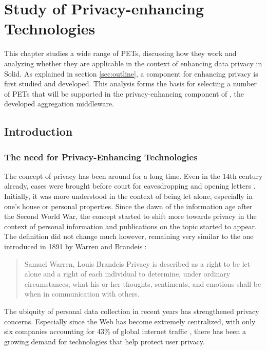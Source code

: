 \chapter{Study of Privacy-enhancing Technologies}
\label{cha:analysis}
This chapter studies a wide range of \gls{PETs}, discussing how they work and analyzing whether they are applicable in the context of enhancing data privacy in Solid. As explained in section \ref{sec:outline}, a component for enhancing privacy is first studied and developed. 
This analysis forms the basis for selecting a number of \gls{PETs} that will be supported in the privacy-enhancing component of \middleware{}, the developed aggregation middleware. 

\section{Introduction}
\label{sec:pets}
\subsection{The need for Privacy-Enhancing Technologies}
The concept of privacy has been around for a long time. Even in the 14th century already, cases were brought before court for eavesdropping and opening letters \citep{privacy-history}. Initially, it was more understood in the context of being let alone, especially in one's house or personal properties. Since the dawn of the information age after the Second World War, the concept started to shift more towards privacy in the context of personal information and publications on the topic started to appear. The definition did not change much however, remaining very similar to the one introduced in 1891 by Warren and Brandeis \citep{privacy-history}:
\begin{quote}{Samuel Warren, Louis Brandeis}
    Privacy is described as a right to be let alone and a right of each individual  to  determine,  under  ordinary  circumstances,  what  his  or  her  thoughts, sentiments, and emotions shall be when in communication with others.
\end{quote}
\noindent The ubiquity of personal data collection in recent years has strengthened privacy concerns. Especially since the Web has become extremely centralized, with only six companies accounting for 43\% of global internet traffic \citep{internet-report}, there has been a growing demand for technologies that help protect user privacy.

